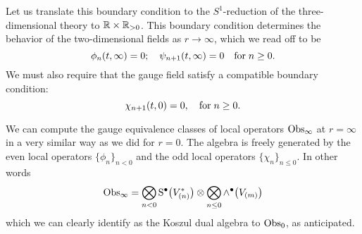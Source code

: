 \documentclass[11pt]{amsart}
\def\brian#1{{\textcolor{blue!65!red}{BRW: {#1}}}}
\begin{document}
%
%
%

Let us translate this boundary condition to the $S^1$-reduction of the three-dimensional theory to $\mathbb R \times \mathbb R_{>0}$. 
This boundary condition determines the behavior of the two-dimensional fields as $r \to \infty$, which we read off to be 
\begin{equation}\label{eqn:bc2}
\phi_n (t, \infty) = 0 ; \quad \psi_{n+1} (t, \infty) = 0 \quad {\rm for} \; n \geq 0 .
\end{equation}
We must also require that the gauge field satisfy a compatible boundary condition:
\begin{equation}\label{eqn:gbc2}
\chi_{n+1} (t,0) = 0, \quad {\rm for} \; n \geq 0 .
\end{equation}

We can compute the gauge equivalence classes of local operators ${\rm Obs}_\infty$ at $r = \infty$ in a very similar way as we did for $r = 0$. 
The algebra is freely generated by the even local operators $\{\phi_n\}_{n < 0}$ and the odd local operators $\{\chi_n\}_{n \leq 0}$. 
In other words
\[
{\rm Obs}_\infty = \bigotimes_{n < 0} {\rm S}^\bullet \big(V^*_{(n)}\big) \otimes \bigotimes_{n \leq 0} \wedge^\bullet \big(V_{(m)}\big)
\]
which we can clearly identify as the Koszul dual algebra to ${\rm Obs}_0$, as anticipated.
\end{document}
